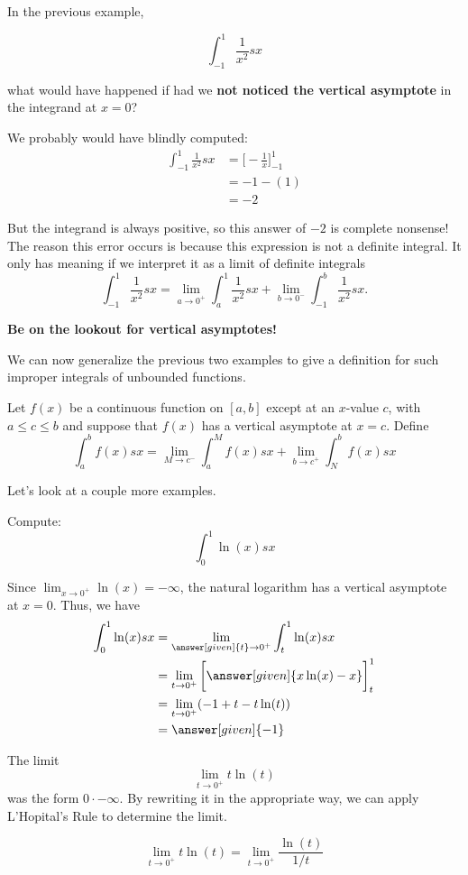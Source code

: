 \documentclass{ximera}
\begin{document}
\begin{warning}
In the previous example,

\[
\int_{-1}^{1} \frac{1}{x^2} sx
\]

 what would have happened if had we \textbf{not
  noticed the vertical asymptote} in the integrand at $x=0$?

We probably would have blindly computed:
\begin{align*}
  \int_{-1}^1\frac1{x^2}sx &= \bigg[-\frac{1}{x}\bigg]_{-1}^1\\
  &= -1 - (1)\\
  &=-2
\end{align*}

But the integrand is always positive, so this answer of $-2$ is
complete nonsense! The reason this error occurs is because this expression is not a definite integral. It only has meaning if we
interpret it as a limit of definite integrals 
\[
 \int_{-1}^1 \frac{1}{x^2} sx = \lim_{a \to 0^+} \int_{a}^1 \frac{1}{x^2} sx  + \lim_{b \to 0^-} \int_{-1}^{b} \frac{1}{x^2} sx.
\]


\textbf{Be on the lookout for vertical asymptotes!}
\end{warning}


We can now generalize the previous two examples to give a definition for such 
improper integrals of unbounded functions.

\begin{definition}
Let $f(x)$ be a continuous function on $[a,b]$ except at an $x$-value $c$, with $a\leq
c\leq b$ and suppose that $f(x)$ has a vertical asymptote at $x=c$. Define
\[
\int_a^b f(x)sx = \lim_{M\to c^-}\int_a^M f(x)sx + \lim_{b\to c^+}\int_N^b f(x)sx
\]
\end{definition}

Let's look at a couple more examples. 


\begin{example}
  Compute:
  \[
  \int_0^1 \ln(x)sx
  \]
  \begin{explanation}
    Since $\lim_{x\to 0^+} \ln(x) = -\infty$, the natural logarithm
    has a vertical asymptote at $x = 0$. Thus, we have
    \begin{align*}
    \int_0^1 \ln(x) sx &=\lim_{\answer[given]{t}\to 0^+} \int_t^1 \ln(x) sx \\
    &= \lim_{t\to 0^+} \bigg[\answer[given]{x \ln(x)-x}\bigg]_t^1 \\
    &=\lim_{t \to 0^{+}} ( -1 + t - t\ln(t) ) \\
&=\answer[given]{ -1} 
      \end{align*}
\begin{hint}
The limit 
\[
\lim_{t \to 0^{+}} t\ln(t)
\]
was the form $0\cdot -\infty$. By rewriting it in the appropriate way, we can apply L'Hopital's Rule to 
determine the limit. 

\[
\lim_{t \to 0^{+}} t\ln(t) =\lim_{t \to 0^{+}} \frac{\ln(t)}{1/t}
\]
\end{hint}
  \end{explanation}
\end{example}
\end{document}

